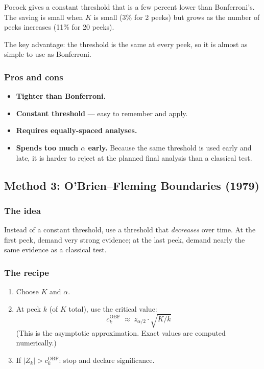 \documentclass[12pt, a4paper]{article}
\begin{document}
\begin{plainlanguage}
Pocock gives a constant threshold that is a few percent lower than
Bonferroni's.  The saving is small when $K$ is small (3\% for 2 peeks)
but grows as the number of peeks increases (11\% for 20 peeks).

The key advantage: the threshold is the same at every peek, so it is
almost as simple to use as Bonferroni.
\end{plainlanguage}

\subsubsection*{Pros and cons}

\begin{itemize}[nosep]
  \item[\textcolor{green!60!black}{+}] \textbf{Tighter than Bonferroni.}
  \item[\textcolor{green!60!black}{+}] \textbf{Constant threshold} --- easy
        to remember and apply.
  \item[\textcolor{red}{--}] \textbf{Requires equally-spaced analyses.}
  \item[\textcolor{red}{--}] \textbf{Spends too much $\alpha$ early.}
        Because the same threshold is used early and late, it is harder to
        reject at the planned final analysis than a classical test.
\end{itemize}


\subsection{Method 3: O'Brien--Fleming Boundaries (1979)}

\subsubsection*{The idea}

Instead of a constant threshold, use a threshold that \emph{decreases} over
time.  At the first peek, demand very strong evidence; at the last peek,
demand nearly the same evidence as a classical test.

\subsubsection*{The recipe}

\begin{enumerate}[nosep]
  \item Choose $K$ and $\alpha$.
  \item At peek $k$ (of $K$ total), use the critical value:
        \[
          c_k^{\text{OBF}} \;\approx\; z_{\alpha/2} \cdot \sqrt{K/k}
        \]
        (This is the asymptotic approximation.  Exact values are computed
        numerically.)
  \item If $|Z_k| > c_k^{\text{OBF}}$: stop and declare significance.
\end{enumerate}
\end{document}

